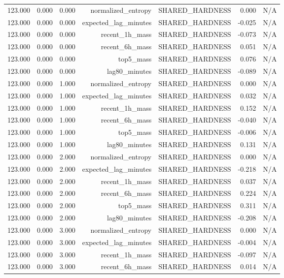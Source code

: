 \begin{table}[h!]
\begin{tabular}{lrrrrrr}
123.000 & 0.000 & 0.000 & normalized\_entropy & SHARED\_HARDNESS & 0.000 & N/A \\
123.000 & 0.000 & 0.000 & expected\_lag\_minutes & SHARED\_HARDNESS & -0.025 & N/A \\
123.000 & 0.000 & 0.000 & recent\_1h\_mass & SHARED\_HARDNESS & -0.073 & N/A \\
123.000 & 0.000 & 0.000 & recent\_6h\_mass & SHARED\_HARDNESS & 0.051 & N/A \\
123.000 & 0.000 & 0.000 & top5\_mass & SHARED\_HARDNESS & 0.076 & N/A \\
123.000 & 0.000 & 0.000 & lag80\_minutes & SHARED\_HARDNESS & -0.089 & N/A \\
123.000 & 0.000 & 1.000 & normalized\_entropy & SHARED\_HARDNESS & 0.000 & N/A \\
123.000 & 0.000 & 1.000 & expected\_lag\_minutes & SHARED\_HARDNESS & 0.032 & N/A \\
123.000 & 0.000 & 1.000 & recent\_1h\_mass & SHARED\_HARDNESS & 0.152 & N/A \\
123.000 & 0.000 & 1.000 & recent\_6h\_mass & SHARED\_HARDNESS & -0.040 & N/A \\
123.000 & 0.000 & 1.000 & top5\_mass & SHARED\_HARDNESS & -0.006 & N/A \\
123.000 & 0.000 & 1.000 & lag80\_minutes & SHARED\_HARDNESS & 0.131 & N/A \\
123.000 & 0.000 & 2.000 & normalized\_entropy & SHARED\_HARDNESS & 0.000 & N/A \\
123.000 & 0.000 & 2.000 & expected\_lag\_minutes & SHARED\_HARDNESS & -0.218 & N/A \\
123.000 & 0.000 & 2.000 & recent\_1h\_mass & SHARED\_HARDNESS & 0.037 & N/A \\
123.000 & 0.000 & 2.000 & recent\_6h\_mass & SHARED\_HARDNESS & 0.224 & N/A \\
123.000 & 0.000 & 2.000 & top5\_mass & SHARED\_HARDNESS & 0.311 & N/A \\
123.000 & 0.000 & 2.000 & lag80\_minutes & SHARED\_HARDNESS & -0.208 & N/A \\
123.000 & 0.000 & 3.000 & normalized\_entropy & SHARED\_HARDNESS & 0.000 & N/A \\
123.000 & 0.000 & 3.000 & expected\_lag\_minutes & SHARED\_HARDNESS & -0.004 & N/A \\
123.000 & 0.000 & 3.000 & recent\_1h\_mass & SHARED\_HARDNESS & -0.097 & N/A \\
123.000 & 0.000 & 3.000 & recent\_6h\_mass & SHARED\_HARDNESS & 0.014 & N/A \\

\end{tabular}
\end{table}

